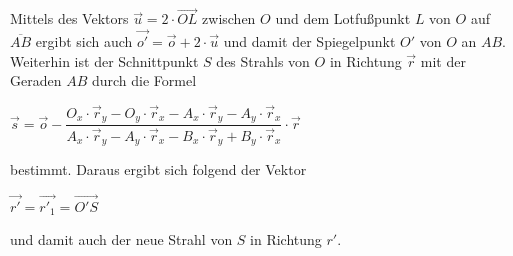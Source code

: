 \documentclass[a4paper, 11pt]{scrartcl}
\begin{document}
Mittels des Vektors $\vec{u} = 2\cdot\overrightarrow{OL}$ zwischen $O$ und dem Lotfußpunkt $L$ von $O$ auf $\overline{AB}$ ergibt sich auch $\vec{o'} = \vec{o} + 2\cdot\vec{u}$ und damit der Spiegelpunkt $O'$ von $O$ an $AB$.
Weiterhin ist der Schnittpunkt $S$ des Strahls von $O$ in Richtung $\vec{r}$ mit der Geraden $AB$ durch die Formel\\
\begin{center}
$\vec{s} = \vec{o} - \dfrac{O_x \cdot \vec{r}_y - O_y \cdot \vec{r}_x - A_x \cdot \vec{r}_y - A_y \cdot \vec{r}_x}{A_x \cdot \vec{r}_y - A_y \cdot \vec{r}_x - B_x \cdot \vec{r}_y + B_y \cdot \vec{r}_x} \cdot \vec{r}$
\end{center}
bestimmt. 
Daraus ergibt sich folgend der Vektor\\
\begin{center}
$\vec{r'} = \vec{r'_1} = \overrightarrow{O'S}$
\end{center}
und damit auch der neue Strahl von $S$ in Richtung $r'$.


\end{document}
